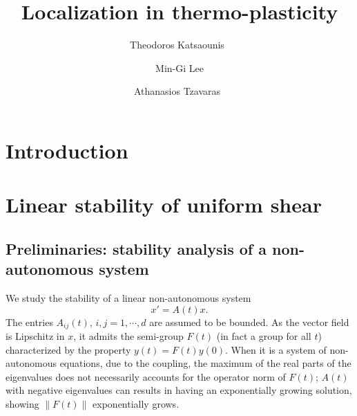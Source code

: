 \documentclass[a4paper,11pt]{article}
\theoremstyle{remark}
\begin{document}
\title{Localization in thermo-plasticity}
\author{Theodoros Katsaounis\footnotemark[1]\ \footnotemark[2]
\and Min-Gi Lee\footnotemark[1]
\and Athanasios Tzavaras\footnotemark[1]\  \footnotemark[2]  \footnotemark[3]}
\date{}

\maketitle
\renewcommand{\thefootnote}{\fnsymbol{footnote}}
\renewcommand{\thefootnote}{\arabic{footnote}}
\maketitle

%
\tableofcontents
\pagebreak
\section{Introduction}
\section{Linear stability of uniform shear}
\subsection{Preliminaries: stability analysis of a non-autonomous system}
We study the stability of a linear non-autonomous system
$$ x'=A(t) x.$$
The entries $A_{ij}(t)$, $i,j=1,\cdots,d$ are assumed to be bounded. As the vector field is Lipschitz in $x$, it admits the semi-group $F(t)$ (in fact a group for all $t$) characterized by the property $y(t)=F(t)y(0)$. When it is a system of non-autonomous equations, due to the coupling, the maximum of the real parts of the eigenvalues does not necessarily accounts for the operator norm of $F(t)$; $A(t)$ with negative eigenvalues can results in having an exponentially growing solution, showing $\|F(t)\|$ exponentially grows.
\end{document}
